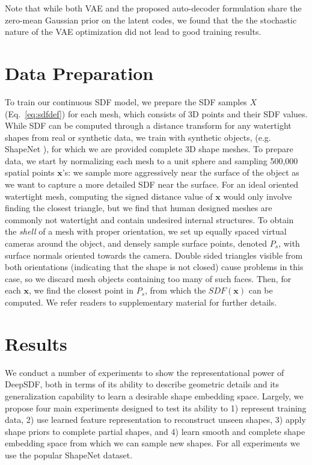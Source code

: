 \documentclass[10pt,twocolumn,letterpaper]{article}
\begin{document}
Note that while both VAE and the proposed auto-decoder formulation share the zero-mean Gaussian prior on the latent codes, we found that the the stochastic nature of the VAE optimization did not lead to good training results. 




\section{Data Preparation} \label{sec: data}
To train our continuous SDF model, we prepare the SDF samples $X$ (Eq.~\ref{eq:sdfdef}) for each mesh, which consists of 3D points and their SDF values. While SDF can be computed through a distance transform for any watertight shapes  from real or synthetic data, we train with synthetic objects, (e.g. ShapeNet \cite{chang2015shapenet}), for which we are provided complete 3D shape meshes. To prepare data, we start by normalizing each mesh to a unit sphere and sampling 500,000 spatial points $\bm{x}$'s: we sample more aggressively near the surface of the object as we want to capture a more detailed SDF near the surface. 
For an ideal oriented watertight mesh, computing the signed distance value of $\bm{x}$ would only involve finding the closest triangle, but we find that human designed meshes are commonly not watertight and contain undesired internal structures. To obtain the {\em shell} of a mesh with proper orientation, we set up equally spaced virtual cameras around the object, and densely sample surface points, denoted $P_s$, with surface normals oriented towards the  camera. Double sided triangles visible from both orientations (indicating that the shape is not closed) cause problems in this case, so we discard mesh objects containing too many of such faces. Then, for each $\bm{x}$, we find the closest point in $P_s$, from which the $SDF(\bm{x})$ can be computed. We refer  readers to supplementary material for further details.




\section{Results} 
We conduct a number of experiments to show the representational power of DeepSDF, both in terms of its ability to describe geometric details and its generalization capability to learn a desirable shape embedding space. Largely, we propose four main experiments designed to test its ability to 1)  represent training data, 2) use learned feature representation to reconstruct unseen shapes, 3) apply shape priors to complete partial shapes, and 4) learn smooth and complete shape embedding space from which we can sample new shapes. For all experiments we use the popular ShapeNet \cite{chang2015shapenet} dataset.
\end{document}
